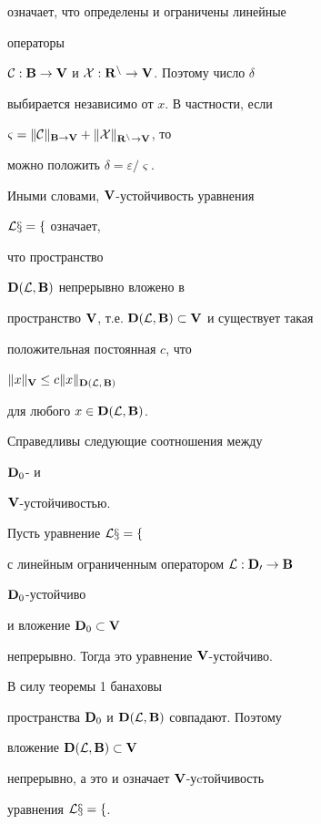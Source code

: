 означает, что определены и ограничены линейные


операторы


$\cal C:\bold B\to\bold V$ и $\cal X:\bold R^n\to\bold V$. Поэтому число $\delta$


выбирается независимо от $x$. В частности, если


$\varsigma=\|\cal C\|_{\bold B\to\bold V} +


\|\cal X\|_{\bold R^n\to\bold V}$, то


можно положить $\delta=\varepsilon/\varsigma$.





Иными словами, $\bold V$-устойчивость уравнения


$\cal L x=f$ означает,


что пространство


$\bold D(\cal L,\bold B)$ непрерывно вложено в


пространство $\spc V$, т.е. $\spc D(\cal


L,\spc B)\subset\spc V$ и существует такая


положительная постоянная $c$, что


$\|x\|_{\bold V}\le c\|x\|_{\bold D(\cal L,\,\bold B)}$


для любого $x\in\bold D(\cal L,\bold B)$.





Справедливы следующие соотношения между


$\bold D_0$- и


$\bold V$-устойчивостью.





\begin{lem} Пусть уравнение $\cal L x=f$


с линейным ограниченным оператором $\cal L:\bold D_0\to\bold B$


$\bold D_0$-устойчиво


и вложение $\bold D_0\subset\bold V$


непрерывно. Тогда это уравнение $\bold V$-устойчиво.


\end{lem}





\begin{pf} В силу теоремы 1 банаховы


пространства $\bold D_0$ и $\bold D(\cal L,\bold B)$ совпадают. Поэтому


вложение $\bold D(\cal L,\bold B)\subset\bold V$


непрерывно, а это и означает $\bold V$-уcтойчивость


уравнения $\cal L x=f$.


\end{pf}





